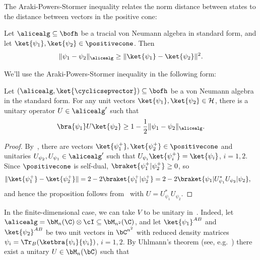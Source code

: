 The Araki-Powers-Stormer inequality relates the norm distance between states to the distance between vectors in the positive cone:
\begin{proposition} \label{prop:Araki_Powers_Stormer}
	Let $\alicealg \subseteq \bofh$ be a tracial von Neumann algebra in standard form, and let $\ket{\psi_1}, \ket{\psi_2} \in \positivecone$. Then
	\begin{equation*}
		\|\psi_1 - \psi_2\|_{\alicealg} \geq \| \ket{\psi_1} - \ket{\psi_2}\|^2 . 
	\end{equation*}
\end{proposition}
We'll use the Araki-Powers-Stormer inequality in the following form:
\begin{proposition}	\label{prop:uhlmann}
	Let $(\alicealg, \ket{\cyclicsepvector})\subseteq \bofh$ be a von Neumann algebra in the standard form. For any unit vectors $\ket{\psi_1}, \ket{\psi_2} \in \cal{H}$, there is a unitary operator $U \in \alicealg'$ such that
	\begin{equation} \label{eq:uhlmann}
		\bra{\psi_1} U \ket{\psi_2} \geq 1 - \frac{1}{2} \| \psi_1 - \psi_2 \|_{\alicealg}.
	\end{equation}
\end{proposition}
\begin{proof}
	By~, there are vectors $\ket{\psi_1^{+}}, \ket{\psi_2^{+}} \in \positivecone$ and unitaries $U_{\psi_2}, U_{\psi_1} \in \alicealg'$ such that $U_{\psi_i} \ket{\psi_i^{+}} = \ket{\psi_i}$, $i=1,2$. Since $\positivecone$ is self-dual, $\braket{\psi_1^+|\psi_2^+} \geq 0$, so 
	\begin{align*}
		\| \ket{\psi_1^+} - \ket{\psi_2^+} \| &= 2 - 2 \braket{\psi_1^+|\psi_2^+} = 2 - 2 \braket{\psi_1|U_{\psi_1}^* U_{\psi_2}|\psi_2},
	\end{align*}
	and hence the proposition follows from~ with $U = U_{\psi_1}^* U_{\psi_2}$.
\end{proof}
In the finite-dimensional case, we can take $V$ to be unitary in~. Indeed, let $\alicealg = \bM_n(\C) \otimes \cI \subseteq \bM_{n^2}(\C)$, and let $\ket{\psi_1}^{AB}$ and $\ket{\psi_2}^{AB}$ be two unit vectors in $\bC^{n^2}$ with reduced density matrices $\psi_i = \Tr_B(\ketbra{\psi_i}{\psi_i})$, $i=1,2$. By Uhlmann's theorem (see, e.g.~\cite[Theorem 9.2.1]{wildeQuantumInformationTheory2013}) there exist a unitary $U \in \bM_n(\bC)$ such that 
